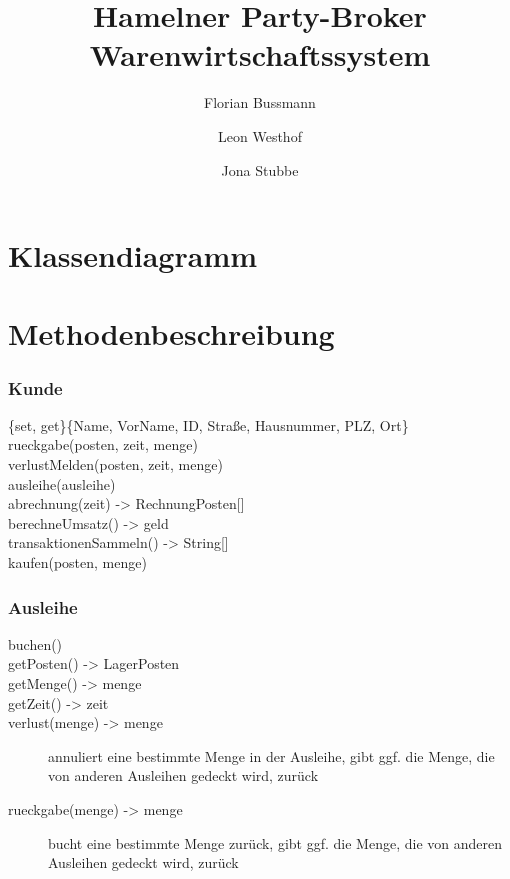 \documentclass[a4paper,12pt]{book}
\title{Hamelner Party-Broker Warenwirtschaftssystem}
\author{Florian Bussmann \and Leon Westhof \and Jona Stubbe}
\begin{document}
\frontmatter
\maketitle
\tableofcontents
\mainmatter
\part{Klassendiagramm}
\part{Methodenbeschreibung}
\section{Kunde}
\begin{description}
\item[\{set, get\}\{Name, VorName, ID, Straße, Hausnummer, PLZ, Ort\}]
\item[rueckgabe(posten, zeit, menge)]
\item[verlustMelden(posten, zeit, menge)]
\item[ausleihe(ausleihe)]
\item[abrechnung(zeit) -> RechnungPosten{[]}]
\item[berechneUmsatz() -> geld]
\item[transaktionenSammeln() -> String{[]}]
\item[kaufen(posten, menge)]
\end{description}
\section{Ausleihe}
\begin{description}
\item[buchen()]
\item[getPosten() -> LagerPosten]
\item[getMenge() -> menge]
\item[getZeit() -> zeit]
\item[verlust(menge) -> menge]
annuliert eine bestimmte Menge in der Ausleihe, gibt ggf. die Menge, die von anderen Ausleihen gedeckt wird, zurück
\item[rueckgabe(menge) -> menge]
bucht eine bestimmte Menge zurück, gibt ggf. die Menge, die von anderen Ausleihen gedeckt wird, zurück
\end{description}
\end{document}

